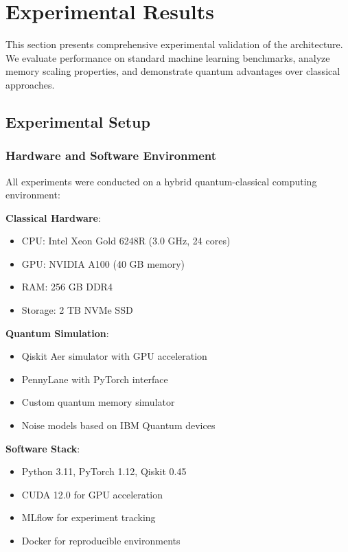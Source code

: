 \section{Experimental Results}
\label{sec:results}

This section presents comprehensive experimental validation of the \qmnn architecture. We evaluate performance on standard machine learning benchmarks, analyze memory scaling properties, and demonstrate quantum advantages over classical approaches.

\subsection{Experimental Setup}

\subsubsection{Hardware and Software Environment}

All experiments were conducted on a hybrid quantum-classical computing environment:

\textbf{Classical Hardware}:
\begin{itemize}
    \item CPU: Intel Xeon Gold 6248R (3.0 GHz, 24 cores)
    \item GPU: NVIDIA A100 (40 GB memory)
    \item RAM: 256 GB DDR4
    \item Storage: 2 TB NVMe SSD
\end{itemize}

\textbf{Quantum Simulation}:
\begin{itemize}
    \item Qiskit Aer simulator with GPU acceleration
    \item PennyLane with PyTorch interface
    \item Custom quantum memory simulator
    \item Noise models based on IBM Quantum devices
\end{itemize}

\textbf{Software Stack}:
\begin{itemize}
    \item Python 3.11, PyTorch 1.12, Qiskit 0.45
    \item CUDA 12.0 for GPU acceleration
    \item MLflow for experiment tracking
    \item Docker for reproducible environments
\end{itemize}

